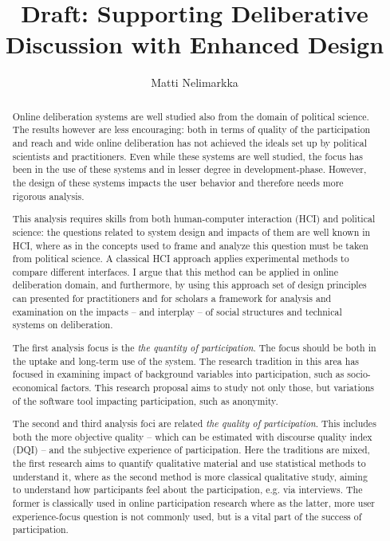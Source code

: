 \documentclass{article}
\author{Matti Nelimarkka}
\title{Draft: Supporting Deliberative Discussion with Enhanced Design}
\begin{document}
\maketitle

\setlength{\parindent}{0pt}
\setlength{\parskip}{1ex}

\begin{abstract}
Online deliberation systems are well studied also from the domain of political science. The results however are less encouraging: both in terms of quality of the participation and reach and wide online deliberation has not achieved the ideals set up by political scientists and practitioners. Even while these systems are well studied, the focus has been in the use of these systems and in lesser degree in development-phase. However, the design of these systems impacts the user behavior and therefore needs more rigorous analysis.

This analysis requires skills from both human-computer interaction (HCI) and political science: the questions related to system design and impacts of them are well known in HCI, where as in the concepts used to frame and analyze this question must be taken from political science. A classical HCI approach applies experimental methods to compare different interfaces. I argue that this method can be applied in online deliberation domain, and furthermore, by using this approach set of design principles can presented for practitioners and for scholars a framework for analysis and examination on the impacts -- and interplay -- of social structures and technical systems on deliberation.

The first analysis focus is the \textit{the quantity of participation}. The focus should be both in the uptake and long-term use of the system. The research tradition in this area has focused in examining impact of background variables into participation, such as socio-economical factors. This research proposal aims to study not only those, but variations of the software tool impacting participation, such as anonymity.

The second and third analysis foci are related \textit{the quality of participation}. This includes both the more objective quality -- which can be estimated with  discourse quality index (DQI) -- and the subjective experience of participation. Here the traditions are mixed, the first research aims to quantify qualitative material and use statistical methods to understand it, where as the second method is more classical qualitative study, aiming to understand how participants feel about the participation, e.g. via interviews. The former is classically used in online participation research where as the latter, more user experience-focus question is not commonly used, but is a vital part of the success of participation.
\end{abstract}
\end{document}
